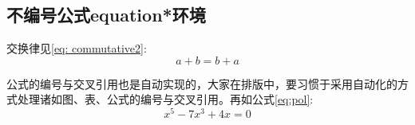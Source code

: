 \documentclass{article}%
\begin{document}
	\subsection{不编号公式equation*环境}
	交换律见\ref{eq: commutative2}:
	\begin{equation*}
		a+b=b+a \label{eq: commutative2}
	\end{equation*}
	
	公式的编号与交叉引用也是自动实现的，大家在排版中，要习惯于采用自动化的方式处理诸如图、表、公式的编号与交叉引用。再如公式\ref{eq:pol}:
	\begin{equation}
		x^5 - 7x^3 + 4x = 0 \label{eq:pol}
	\end{equation}
	
	
\end{document}
